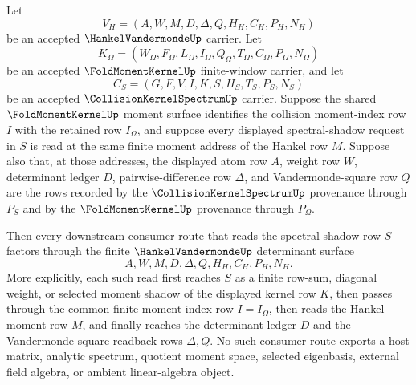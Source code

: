 \begin{theorem}
\label{thm:hankel-vandermonde-spectral-shadow-bridge}
Let
$$
V_H=(A,W,M,D,\Delta,Q,H_H,C_H,P_H,N_H)
$$
be an accepted $\HankelVandermondeUp$ carrier. Let
$$
K_{\Omega}=(W_{\Omega},F_{\Omega},L_{\Omega},I_{\Omega},Q_{\Omega},T_{\Omega},C_{\Omega},P_{\Omega},N_{\Omega})
$$
be an accepted $\FoldMomentKernelUp$ finite-window carrier, and let
$$
C_S=(G,F,V,I,K,S,H_S,T_S,P_S,N_S)
$$
be an accepted $\CollisionKernelSpectrumUp$ carrier. Suppose the shared $\FoldMomentKernelUp$ moment surface identifies the collision moment-index row $I$ with the retained row $I_{\Omega}$, and suppose every displayed spectral-shadow request in $S$ is read at the same finite moment address of the Hankel row $M$. Suppose also that, at those addresses, the displayed atom row $A$, weight row $W$, determinant ledger $D$, pairwise-difference row $\Delta$, and Vandermonde-square row $Q$ are the rows recorded by the $\CollisionKernelSpectrumUp$ provenance through $P_S$ and by the $\FoldMomentKernelUp$ provenance through $P_{\Omega}$.

Then every downstream consumer route that reads the spectral-shadow row $S$ factors through the finite $\HankelVandermondeUp$ determinant surface
$$
A,W,M,D,\Delta,Q,H_H,C_H,P_H,N_H.
$$
More explicitly, each such read first reaches $S$ as a finite row-sum, diagonal weight, or selected moment shadow of the displayed kernel row $K$, then passes through the common finite moment-index row $I=I_{\Omega}$, then reads the Hankel moment row $M$, and finally reaches the determinant ledger $D$ and the Vandermonde-square readback rows $\Delta,Q$. No such consumer route exports a host matrix, analytic spectrum, quotient moment space, selected eigenbasis, external field algebra, or ambient linear-algebra object.
\end{theorem}
